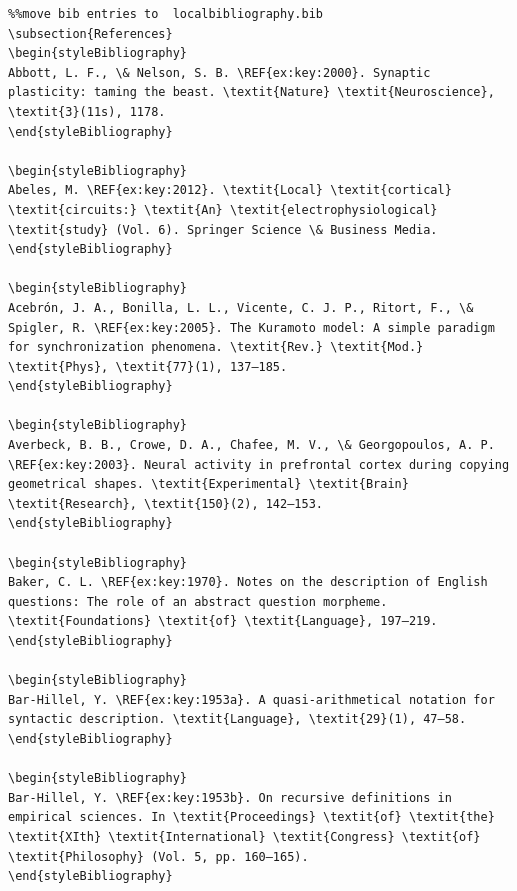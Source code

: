 \begin{verbatim}%%move bib entries to  localbibliography.bib
\subsection{References}
\begin{styleBibliography}
Abbott, L. F., \& Nelson, S. B. \REF{ex:key:2000}. Synaptic plasticity: taming the beast. \textit{Nature} \textit{Neuroscience}, \textit{3}(11s), 1178.
\end{styleBibliography}

\begin{styleBibliography}
Abeles, M. \REF{ex:key:2012}. \textit{Local} \textit{cortical} \textit{circuits:} \textit{An} \textit{electrophysiological} \textit{study} (Vol. 6). Springer Science \& Business Media.
\end{styleBibliography}

\begin{styleBibliography}
Acebrón, J. A., Bonilla, L. L., Vicente, C. J. P., Ritort, F., \& Spigler, R. \REF{ex:key:2005}. The Kuramoto model: A simple paradigm for synchronization phenomena. \textit{Rev.} \textit{Mod.} \textit{Phys}, \textit{77}(1), 137–185.
\end{styleBibliography}

\begin{styleBibliography}
Averbeck, B. B., Crowe, D. A., Chafee, M. V., \& Georgopoulos, A. P. \REF{ex:key:2003}. Neural activity in prefrontal cortex during copying geometrical shapes. \textit{Experimental} \textit{Brain} \textit{Research}, \textit{150}(2), 142–153.
\end{styleBibliography}

\begin{styleBibliography}
Baker, C. L. \REF{ex:key:1970}. Notes on the description of English questions: The role of an abstract question morpheme. \textit{Foundations} \textit{of} \textit{Language}, 197–219.
\end{styleBibliography}

\begin{styleBibliography}
Bar-Hillel, Y. \REF{ex:key:1953a}. A quasi-arithmetical notation for syntactic description. \textit{Language}, \textit{29}(1), 47–58.
\end{styleBibliography}

\begin{styleBibliography}
Bar-Hillel, Y. \REF{ex:key:1953b}. On recursive definitions in empirical sciences. In \textit{Proceedings} \textit{of} \textit{the} \textit{XIth} \textit{International} \textit{Congress} \textit{of} \textit{Philosophy} (Vol. 5, pp. 160–165).
\end{styleBibliography}


\end{verbatim}
